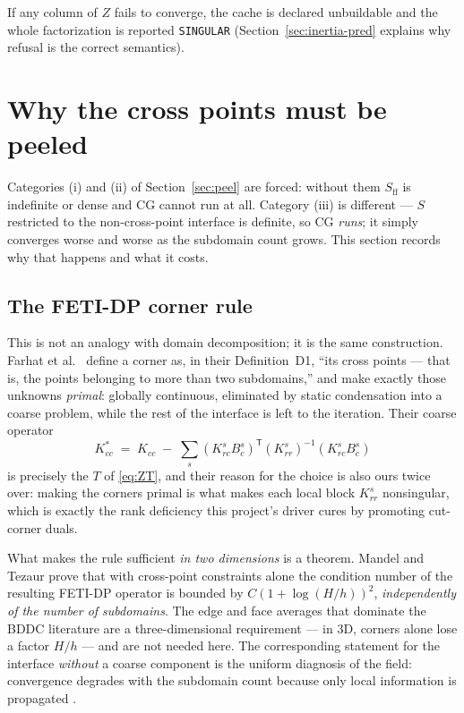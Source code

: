 \documentclass[11pt]{article}
\newcommand{\code}[1]{\texttt{#1}}
\newcommand{\Sff}{S_{\mathrm{ff}}}
\begin{document}
If any column of $Z$ fails to converge, the cache is declared unbuildable
and the whole factorization is reported \code{SINGULAR}
(Section~\ref{sec:inertia-pred} explains why refusal is the correct
semantics).

\section{Why the cross points must be peeled}
\label{sec:crosspoints}

Categories (i) and (ii) of Section~\ref{sec:peel} are forced: without them
$\Sff$ is indefinite or dense and CG cannot run at all.  Category (iii) is
different --- $S$ restricted to the non-cross-point interface is definite, so
CG \emph{runs}; it simply converges worse and worse as the subdomain count
grows.  This section records why that happens and what it costs.

\subsection{The FETI-DP corner rule}

This is not an analogy with domain decomposition; it is the same construction.
Farhat et al.\ \cite{farhat2001fetidp} define a corner as, in their
Definition~D1, ``its cross points --- that is, the points belonging to more
than two subdomains,'' and make exactly those unknowns \emph{primal}: globally
continuous, eliminated by static condensation into a coarse problem, while the
rest of the interface is left to the iteration.  Their coarse operator
\[
  K^*_{cc} \;=\; K_{cc} \;-\; \sum_s (K^s_{rc}B^s_c)^{\mathsf T}(K^s_{rr})^{-1}(K^s_{rc}B^s_c)
\]
is precisely the $T$ of \eqref{eq:ZT}, and their reason for the choice is also
ours twice over: making the corners primal is what makes each local block
$K^s_{rr}$ nonsingular, which is exactly the rank deficiency this project's
driver cures by promoting cut-corner duals.

What makes the rule sufficient \emph{in two dimensions} is a theorem.  Mandel
and Tezaur \cite{mandel2001convergence} prove that with cross-point
constraints alone the condition number of the resulting FETI-DP operator is
bounded by $C(1+\log(H/h))^2$, \emph{independently of the number of
subdomains}.  The edge and face averages that dominate the BDDC literature are
a three-dimensional requirement --- in 3D, corners alone lose a factor $H/h$
\cite{klawonn2002dual} --- and are not needed here.  The corresponding
statement for the interface \emph{without} a coarse component is the uniform
diagnosis of the field: convergence degrades with the subdomain count because
only local information is propagated
\cite{klawonn2002dual,farhat2001fetidp}.
\end{document}
